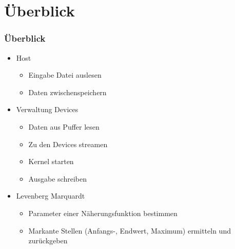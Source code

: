 \documentclass[ddcfooter]{tudbeamer}
\begin{document}
\section{Überblick}
\begin{frame}
    \frametitle*{Überblick}
	\begin{itemize}
	\item{Host}
	\begin{itemize}
		\item{Eingabe Datei auslesen}
		\item{Daten zwischenspeichern}
	\end{itemize}
	\item{Verwaltung Devices}
	\begin{itemize}
		\item{Daten aus Puffer lesen}
		\item{Zu den Devices streamen}
		\item{Kernel starten}
		\item{Ausgabe schreiben}
	\end{itemize}
	\item{Levenberg Marquardt}
	\begin{itemize}
		\item{Parameter einer Näherungsfunktion bestimmen}
		\item{Markante Stellen (Anfangs-, Endwert, Maximum) ermitteln und zurückgeben}
	\end{itemize}
	\end{itemize}
\end{frame}
\end{document}

